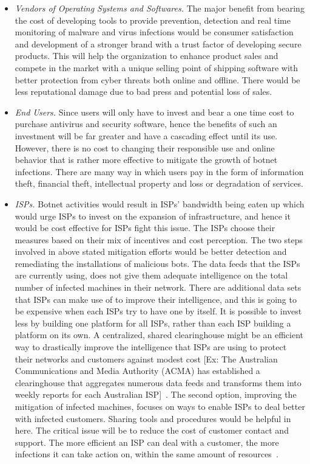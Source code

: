 
\begin{itemize}
\item \textit{Vendors of Operating Systems and Softwares.} The major benefit from bearing the cost of developing tools to provide prevention, detection and real time monitoring of malware and virus infections would be consumer satisfaction and development of a stronger brand with a trust factor of developing secure products. This will help the organization to enhance product sales and compete in the market with a unique selling point of shipping software with better protection from cyber threats both online and offline. There would be less reputational damage due to bad press and potential loss of sales.
\item \textit{End Users.} Since users will only have to invest and bear a one time cost to purchase antivirus and security software, hence the benefits of such an investment will be far greater and have a cascading effect until its use. However, there is no cost to changing their responsible use and online behavior that is rather more effective to mitigate the growth of botnet infections. There are many way in which users pay in the form of information theft, financial theft, intellectual property and loss or degradation of services.


 \item \textit{ISPs.} Botnet activities would result in ISPs' bandwidth being eaten up which would urge ISPs to invest on the expansion of infrastructure, and hence it would be cost effective for ISPs fight this issue. The ISPs choose their measures based on their mix of incentives and cost perception. The two steps involved in above stated mitigation efforts would be better detection and remediating the installations of malicious bots. The data feeds that the ISPs are currently using, does not give them adequate intelligence on the total number of infected machines in their network. There are additional data sets that ISPs can make use of to improve their intelligence, and this is going to be expensive when each ISPs try to have one by itself. It is possible to invest less by building one platform for all ISPs, rather than each ISP building a platform on its own. A centralized, shared clearinghouse might be an efficient way to drastically improve the intelligence that ISPs are using to protect their networks and customers against modest cost [Ex: The Australian Communications and Media Authority (ACMA) has established a clearinghouse that aggregates numerous data feeds and transforms them into weekly reports for each Australian ISP]~\cite{asghari2010botnet}. The second option, improving the mitigation of infected machines, focuses on ways to enable ISPs to deal better with infected customers. Sharing tools and procedures would be helpful in here. The critical issue will be to reduce the cost of customer contact and support. The more efficient an ISP can deal with a customer, the more infections it can take action on, within the same amount of resources~\cite{asghari2010botnet}.
\end{itemize}
